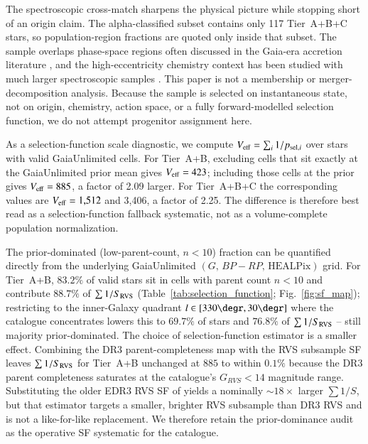 \documentclass{aa}  %
\begin{document}
The spectroscopic cross-match sharpens the physical picture while
stopping short of an origin claim.  The alpha-classified subset contains
only 117 Tier~A+B+C stars, so population-region fractions are quoted only
inside that subset.  The sample overlaps phase-space regions often
discussed in the Gaia-era accretion literature \citep{Belokurov2018,
Helmi2018,Belokurov2023}, and the high-eccentricity chemistry context
has been studied with much larger spectroscopic samples
\citep{Lee2023}.  This paper is not a membership or
merger-decomposition analysis.  Because the sample is selected on
instantaneous state, not on origin, chemistry, action space, or a fully
forward-modelled selection function, we do not attempt progenitor
assignment here.

As a selection-function scale diagnostic, we compute
$V_{\rm eff}=\sum_i 1/p_{{\rm sel},i}$ over stars with valid
GaiaUnlimited cells.  For Tier~A+B, excluding cells that sit exactly at
the GaiaUnlimited prior mean gives $V_{\rm eff}=423$; including those
cells at the prior gives $V_{\rm eff}=885$, a factor of 2.09 larger.  For
Tier~A+B+C the corresponding values are $V_{\rm eff}=1{,}512$ and
3{,}406, a factor of 2.25.  The difference is therefore best read as a
selection-function fallback systematic, not as a volume-complete
population normalization.

The prior-dominated (low-parent-count, $n<10$) fraction can be quantified directly from the underlying
GaiaUnlimited $(G,\,BP{-}RP,\,\mathrm{HEALPix})$ grid.  For Tier~A+B,
$83.2\%$ of valid stars sit in cells with parent count $n<10$ and
contribute $88.7\%$ of $\sum 1/S_{\rm RVS}$
(Table~\ref{tab:selection_function}; Fig.~\ref{fig:sf_map});
restricting to the inner-Galaxy quadrant $l\in[330\degr,30\degr]$
where the catalogue concentrates lowers this to $69.7\%$ of stars and
$76.8\%$ of $\sum 1/S_{\rm RVS}$ -- still majority prior-dominated.
The choice of selection-function estimator is a smaller effect.
Combining the \citet{CantatGaudin2023} DR3 parent-completeness map with
the \citet{CastroGinard2023} RVS subsample SF leaves
$\sum 1/S_{\rm RVS}$ for Tier~A+B unchanged at $885$ to within $0.1\%$
because the DR3 parent completeness saturates at the catalogue's
$G_{RVS}\!<\!14$ magnitude range.  Substituting the older EDR3 RVS SF
of \citet{EverallBoubert2022} yields a nominally $\sim\!18\times$
larger $\sum 1/S$, but that estimator targets a smaller, brighter
RVS subsample than DR3 RVS and is not a like-for-like replacement.
We therefore retain the prior-dominance audit as the operative
SF systematic for the catalogue.
\end{document}

